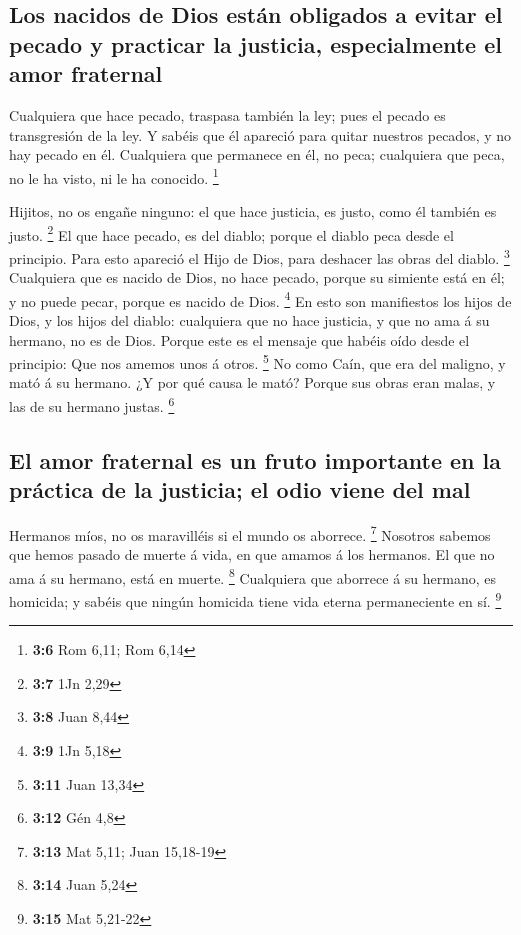 \hypertarget{los-nacidos-de-dios-estuxe1n-obligados-a-evitar-el-pecado-y-practicar-la-justicia-especialmente-el-amor-fraternal}{%
\subsection{Los nacidos de Dios están obligados a evitar el pecado y
practicar la justicia, especialmente el amor
fraternal}\label{los-nacidos-de-dios-estuxe1n-obligados-a-evitar-el-pecado-y-practicar-la-justicia-especialmente-el-amor-fraternal}}

 Cualquiera que hace pecado, traspasa también la ley; pues
el pecado es transgresión de la ley.  Y sabéis que él
apareció para quitar nuestros pecados, y no hay pecado en él.
 Cualquiera que permanece en él, no peca; cualquiera que
peca, no le ha visto, ni le ha conocido. \footnote{\textbf{3:6} Rom
  6,11; Rom 6,14}

 Hijitos, no os engañe ninguno: el que hace justicia, es
justo, como él también es justo. \footnote{\textbf{3:7} 1Jn 2,29}
 El que hace pecado, es del diablo; porque el diablo peca
desde el principio. Para esto apareció el Hijo de Dios, para deshacer
las obras del diablo. \footnote{\textbf{3:8} Juan 8,44} 
Cualquiera que es nacido de Dios, no hace pecado, porque su simiente
está en él; y no puede pecar, porque es nacido de Dios. \footnote{\textbf{3:9}
  1Jn 5,18}  En esto son manifiestos los hijos de Dios, y
los hijos del diablo: cualquiera que no hace justicia, y que no ama á su
hermano, no es de Dios.  Porque este es el mensaje que
habéis oído desde el principio: Que nos amemos unos á otros. \footnote{\textbf{3:11}
  Juan 13,34}  No como Caín, que era del maligno, y mató
á su hermano. ¿Y por qué causa le mató? Porque sus obras eran malas, y
las de su hermano justas. \footnote{\textbf{3:12} Gén 4,8}

\hypertarget{el-amor-fraternal-es-un-fruto-importante-en-la-pruxe1ctica-de-la-justicia-el-odio-viene-del-mal}{%
\subsection{El amor fraternal es un fruto importante en la práctica de
la justicia; el odio viene del
mal}\label{el-amor-fraternal-es-un-fruto-importante-en-la-pruxe1ctica-de-la-justicia-el-odio-viene-del-mal}}

 Hermanos míos, no os maravilléis si el mundo os
aborrece. \footnote{\textbf{3:13} Mat 5,11; Juan 15,18-19}
 Nosotros sabemos que hemos pasado de muerte á vida, en
que amamos á los hermanos. El que no ama á su hermano, está en muerte.
\footnote{\textbf{3:14} Juan 5,24}  Cualquiera que
aborrece á su hermano, es homicida; y sabéis que ningún homicida tiene
vida eterna permaneciente en sí. \footnote{\textbf{3:15} Mat 5,21-22}

